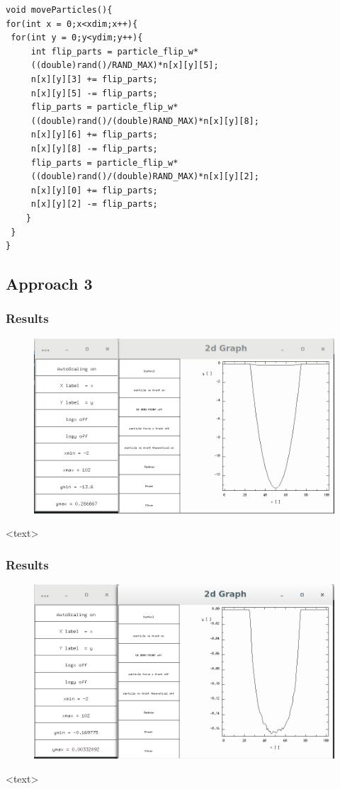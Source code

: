 \documentclass{beamer}
\begin{document}
\begin{frame}[fragile]
\begin{lstlisting}
void moveParticles(){
for(int x = 0;x<xdim;x++){
 for(int y = 0;y<ydim;y++){
	 int flip_parts = particle_flip_w*
	 ((double)rand()/RAND_MAX)*n[x][y][5];
	 n[x][y][3] += flip_parts;
	 n[x][y][5] -= flip_parts;
	 flip_parts = particle_flip_w*
	 ((double)rand()/(double)RAND_MAX)*n[x][y][8];
	 n[x][y][6] += flip_parts;
	 n[x][y][8] -= flip_parts;
	 flip_parts = particle_flip_w*
	 ((double)rand()/(double)RAND_MAX)*n[x][y][2];
	 n[x][y][0] += flip_parts;
	 n[x][y][2] -= flip_parts;
	}
 }
}
\end{lstlisting}
\end{frame}

\subsection{Approach 3}

\begin{frame}
\frametitle{Results}
\begin{figure}
\includegraphics[scale=0.2]{A3p0}
\caption{}
\end{figure}
<text>
\end{frame}

\begin{frame}
\frametitle{Results}
\begin{figure}
\includegraphics[scale=0.2]{A2p3}
\caption{}
\end{figure}
<text>
\end{frame}
\end{document}
